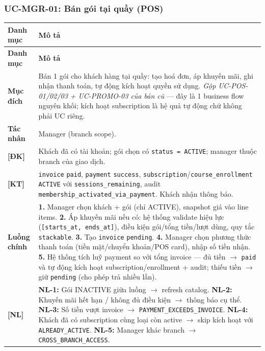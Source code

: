 \subsubsection{UC-MGR-01: Bán gói tại quầy (POS)}
\begingroup
\renewcommand{\arraystretch}{1.3}
\begin{longtable}{|>{\centering\arraybackslash}m{3cm}|>{\raggedright\arraybackslash}m{12cm}|}
\hline
\textbf{Danh mục} & \textbf{Mô tả} \\ \hline
\endfirsthead
\hline
\textbf{Danh mục} & \textbf{Mô tả} \\ \hline
\endhead
\hline
\endfoot
\textbf{Mục đích} & Bán 1 gói cho khách hàng tại quầy: tạo hoá đơn, áp khuyến mãi, ghi nhận thanh toán, tự động kích hoạt quyền sử dụng. \emph{Gộp UC-POS-01/02/03 + UC-PROMO-03 của bản cũ} — đây là 1 business flow nguyên khối; kích hoạt subscription là hệ quả tự động chứ không phải UC riêng. \\
\hline
\textbf{Tác nhân} & Manager (branch scope). \\
\hline
\textbf{[ĐK]} & Khách đã có tài khoản; gói chọn có \texttt{status = ACTIVE}; manager thuộc branch của giao dịch. \\
\hline
\textbf{[KT]} & \texttt{invoice} \texttt{paid}, \texttt{payment} \texttt{success}, \texttt{subscription}/\texttt{course\_enrollment} \texttt{ACTIVE} với \texttt{sessions\_remaining}, audit \texttt{membership\_activated\_via\_payment}. Khách nhận thông báo. \\
\hline
\textbf{Luồng chính} & \textbf{1.} Manager chọn khách + gói (chỉ ACTIVE), snapshot giá vào line items. \textbf{2.} Áp khuyến mãi nếu có: hệ thống validate hiệu lực (\texttt{[starts\_at, ends\_at]}), điều kiện gói/tổng tiền/lượt dùng, quy tắc \texttt{stackable}. \textbf{3.} Tạo \texttt{invoice} \texttt{pending}. \textbf{4.} Manager chọn phương thức thanh toán (tiền mặt/chuyển khoản/POS card), nhập số tiền nhận. \textbf{5.} Hệ thống tích luỹ payment so với tổng invoice — đủ tiền $\rightarrow$ \texttt{paid} và tự động kích hoạt subscription/enrollment + audit; thiếu tiền $\rightarrow$ giữ \texttt{pending} (cho phép trả nhiều lần). \\
\hline
\textbf{[NL]} & \textbf{NL-1:} Gói INACTIVE giữa luồng $\rightarrow$ refresh catalog. \textbf{NL-2:} Khuyến mãi hết hạn / không đủ điều kiện $\rightarrow$ thông báo cụ thể. \textbf{NL-3:} Số tiền vượt invoice $\rightarrow$ \texttt{PAYMENT\_EXCEEDS\_INVOICE}. \textbf{NL-4:} Khách đã có subscription cùng loại còn active $\rightarrow$ skip kích hoạt với \texttt{ALREADY\_ACTIVE}. \textbf{NL-5:} Manager khác branch $\rightarrow$ \texttt{CROSS\_BRANCH\_ACCESS}. \\
\hline
\end{longtable}
\endgroup


